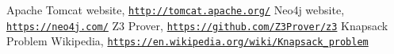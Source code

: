 \begin{thebibliography}{9}
  Apache Tomcat website, \texttt{\url{http://tomcat.apache.org/}}
  Neo4j website, \texttt{\url{https://neo4j.com/}}
  Z3 Prover, \texttt{\url{https://github.com/Z3Prover/z3}}
  Knapsack Problem Wikipedia, \texttt{\url{https://en.wikipedia.org/wiki/Knapsack_problem}}
\end{thebibliography}
